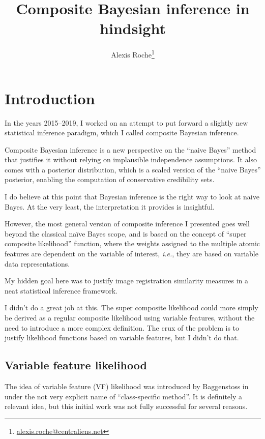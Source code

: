 \documentclass[english]{scrartcl}
\title{Composite Bayesian inference in hindsight}
\author{Alexis Roche\thanks{\url{alexis.roche@centraliens.net}}}
\begin{document}
\maketitle

\section{Introduction}

In the years 2015--2019, I worked on an attempt to put forward a slightly new statistical inference paradigm, which I called composite Bayesian inference.

Composite Bayesian inference is a new perspective on the ``naive Bayes'' method that justifies it without relying on implausible independence assumptions. It also comes with a posterior distribution, which is a scaled version of the ``naive Bayes'' posterior, enabling the computation of conservative credibility sets.

I do believe at this point that Bayesian inference is the right way to look at naive Bayes. At the very least, the interpretation it provides is insightful.

However, the most general version of composite inference I presented goes well beyond the classical na\"ive Bayes scope, and is based on the concept of ``super composite likelihood'' function, where the weights assigned to the multiple atomic features are dependent on the variable of interest, {\em i.e.}, they are based on variable data representations. 

My hidden goal here was to justify image registration similarity measures in a neat statistical inference framework.

I didn't do a great job at this. The super composite likelihood could more simply be derived as a regular composite likelihood using variable features, without the need to introduce a more complex definition. The crux of the problem is to justify likelihood functions based on variable features, but I didn't do that.

\subsection{Variable feature likelihood}

The idea of variable feature (VF) likelihood was introduced by Baggenstoss in \cite{Baggenstoss-03} under the not very explicit name of ``class-specific method''. It is definitely a relevant idea, but this initial work was not fully successful for several reasons.
\end{document}
